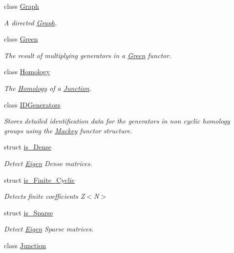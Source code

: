 \begin{DoxyCompactItemize}
class \hyperlink{classMackey_1_1Graph}{Graph}
\begin{DoxyCompactList}\small\item\em A directed \hyperlink{classMackey_1_1Graph}{Graph}. \end{DoxyCompactList}\item 
class \hyperlink{classMackey_1_1Green}{Green}
\begin{DoxyCompactList}\small\item\em The result of multiplying generators in a \hyperlink{classMackey_1_1Green}{Green} functor. \end{DoxyCompactList}\item 
class \hyperlink{classMackey_1_1Homology}{Homology}
\begin{DoxyCompactList}\small\item\em The \hyperlink{classMackey_1_1Homology}{Homology} of a \hyperlink{classMackey_1_1Junction}{Junction}. \end{DoxyCompactList}\item 
class \hyperlink{classMackey_1_1IDGenerators}{I\+D\+Generators}
\begin{DoxyCompactList}\small\item\em Stores detailed identification data for the generators in non cyclic homology groups using the \hyperlink{namespaceMackey}{Mackey} functor structure. \end{DoxyCompactList}\item 
struct \hyperlink{structMackey_1_1is__Dense}{is\+\_\+\+Dense}
\begin{DoxyCompactList}\small\item\em Detect \hyperlink{namespaceEigen}{Eigen} Dense matrices. \end{DoxyCompactList}\item 
struct \hyperlink{structMackey_1_1is__Finite__Cyclic}{is\+\_\+\+Finite\+\_\+\+Cyclic}
\begin{DoxyCompactList}\small\item\em Detects finite coefficients Z$<$\+N$>$ \end{DoxyCompactList}\item 
struct \hyperlink{structMackey_1_1is__Sparse}{is\+\_\+\+Sparse}
\begin{DoxyCompactList}\small\item\em Detect \hyperlink{namespaceEigen}{Eigen} Sparse matrices. \end{DoxyCompactList}\item 
class \hyperlink{classMackey_1_1Junction}{Junction}

\end{DoxyCompactItemize}
